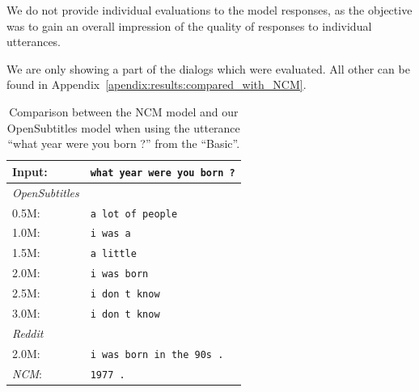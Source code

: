 We do not provide individual evaluations to the model responses, as the objective was to gain an overall impression of the quality of responses to individual utterances.

We are only showing a part of the dialogs which were evaluated. All other can be found in Appendix~\ref{apendix:results:compared_with_NCM}.
\\
\begin{table}[H]
	\centering
	\begin{adjustbox}{max width=\textwidth}
		\begin{tabularx}{\textwidth}{lX}
			\toprule
			Input: 	& \texttt{what year were you born ?}\\
			\midrule
			\emph{OpenSubtitles}\\
			0.5M: 	& \texttt{a lot of people}\\
			1.0M: 	& \texttt{i was a}\\
			1.5M:	& \texttt{a little}\\
			2.0M:	& \texttt{i was born}\\
			2.5M:	& \texttt{i don t know}\\
			3.0M:	& \texttt{i don t know}\\
			\midrule
			\emph{Reddit}\\
			2.0M:	& \texttt{i was born in the 90s .}\\
			\midrule
			\emph{NCM}:	& \texttt{1977 .}\\
			\bottomrule
		\end{tabularx}
	\end{adjustbox}
	\caption{Comparison between the NCM model and our OpenSubtitles model when using the utterance ``what year were you born ?'' from the ``Basic''.}
	\label{results:example8_output:Neural_Conversational_Model_compared}
\end{table}

